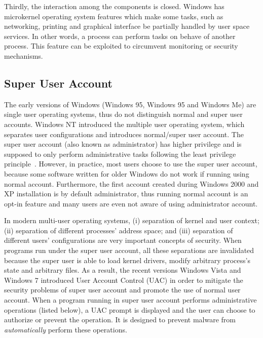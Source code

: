 Thirdly, the interaction among the components is closed.
Windows has microkernel operating system features which make
some tasks, such as networking, printing and graphical interface be partially
handled by user space services.
In other words, a process can perform tasks on behave of another process.
This feature can be exploited to circumvent monitoring or
security mechanisms.

\subsection{Super User Account}

The early versions of Windows (Windows 95, Windows 95 and Windows Me)
are single user operating systems, thus do not distinguish normal and
super user accounts.
Windows NT introduced the multiple user operating system, which
separates user configurations and introduces normal/super user account.
The super user account (also known as administrator) has higher privilege and
is supposed to only perform administrative tasks following the
least privilege principle~\cite{saltzer1975protection}.
However, in practice,
most users choose to use the super user account,
because some software written for older Windows do not work if running using
normal account.
Furthermore, the first account created during Windows 2000 and XP installation
is by default administrator,
thus running normal account is an opt-in feature and
many users are even not aware of using administrator account.

In modern multi-user operating systems,
(i) separation of kernel and user context;
(ii) separation of different processes' address space; and
(iii) separation of different users' configurations are
very important concepts of security.
When programs run under the super user account,
all these separations are invalidated because the super user
is able to load kernel drivers, modify arbitrary process's state
and arbitrary files.
As a result, the recent versions Windows Vista and Windows 7 introduced
User Account Control (UAC) in order to mitigate the security problems of
super user account and promote the use of normal user account.
When a program running in super user account performs administrative
operations (listed below),
a UAC prompt is displayed and the user can choose to authorize or prevent
the operation.
It is designed to prevent malware from {\em automatically}
perform these operations.

